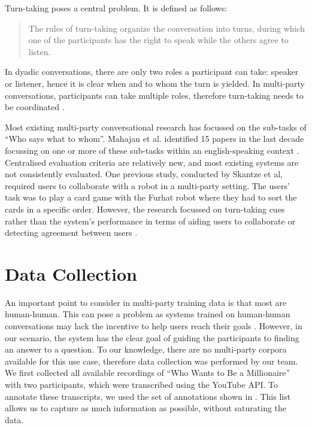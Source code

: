 \documentclass[hidelinks, 11pt]{article}
\begin{document}
Turn-taking poses a central problem. It is defined as follows:

\begin{quote}
  The rules of turn-taking organize the conversation into turns, during which one of the participants has the right to speak while the others agree to listen. \cite{Żarkowski_2019}
\end{quote}

In dyadic conversations, there are only two roles a participant can take: speaker or listener, hence it is clear when and to whom the turn is yielded. In multi-party conversations, participants can take multiple roles, therefore turn-taking needs to be coordinated \cite{Johansson_Skantze_2015}.

Most existing multi-party conversational research has focussed on the sub-tasks of ``Who says what to whom''. Mahajan et al. identified 15 papers in the last decade focussing on one or more of these sub-tasks within an english-speaking context \cite{Mahajan_Santhanam_Shaikh_2022}. Centralised evaluation criteria are relatively new, and most existing systems are not consistently evaluated. One previous study, conducted by Skantze et al, required users to collaborate with a robot in a multi-party setting. The users' task was to play a card game with the Furhat robot where they had to sort the cards in a specific order. However, the research focussed on turn-taking cues rather than the system's performance in terms of aiding users to collaborate or detecting agreement between users \cite{Skantze_Johansson_Beskow_2015,Furhat_2023}.

\section{Data Collection}
\label{sec:data_collection}

An important point to consider in multi-party training data is that most are human-human. This can pose a problem as systems trained on human-human conversations may lack the incentive to help users reach their goals \cite{Addlesee_Data_2023}. However, in our scenario, the system has the clear goal of guiding the participants to finding an answer to a question. To our knowledge, there are no multi-party corpora available for this use case, therefore data collection was performed by our team. We first collected all available recordings of ``Who Wants to Be a Millionaire'' with two participants, which were transcribed using the YouTube API. To annotate these transcripts, we used the set of annotations shown in . This list allows us to capture as much information as possible, without saturating the data.
\end{document}
